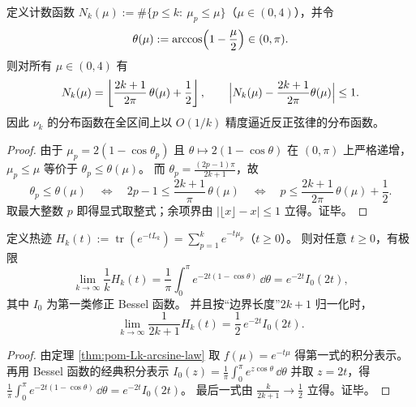 \begin{corollary}\label{cor:pom-Lk-discrete-weyl}
定义计数函数 \(N_k(\mu):=\#\{p\le k:\ \mu_p\le \mu\}\)（\(\mu\in(0,4)\)），并令
\[
\theta(\mu):=\arccos\Bigl(1-\frac{\mu}{2}\Bigr)\in(0,\pi).
\]
则对所有 \(\mu\in(0,4)\) 有
\[
N_k(\mu)=\left\lfloor \frac{2k+1}{2\pi}\,\theta(\mu)+\frac12\right\rfloor,
\qquad
\Bigl|N_k(\mu)-\frac{2k+1}{2\pi}\theta(\mu)\Bigr|\le 1.
\]
因此 \(\nu_k\) 的分布函数在全区间上以 \(O(1/k)\) 精度逼近反正弦律的分布函数。
\end{corollary}
\begin{proof}
由于 \(\mu_p=2(1-\cos\theta_p)\) 且 \(\theta\mapsto 2(1-\cos\theta)\) 在 \((0,\pi)\) 上严格递增，
\(\mu_p\le\mu\) 等价于 \(\theta_p\le \theta(\mu)\)。
而 \(\theta_p=\frac{(2p-1)\pi}{2k+1}\)，故
\[
\theta_p\le\theta(\mu)
\quad\Longleftrightarrow\quad
2p-1\le \frac{2k+1}{\pi}\,\theta(\mu)
\quad\Longleftrightarrow\quad
p\le \frac{2k+1}{2\pi}\,\theta(\mu)+\frac12.
\]
取最大整数 \(p\) 即得显式取整式；余项界由 \(|\lfloor x\rfloor-x|\le 1\) 立得。证毕。
\end{proof}

\begin{corollary}\label{cor:pom-Lk-heat-kernel-bessel}
定义热迹
\(
H_k(t):=\operatorname{tr}(e^{-tL_k})=\sum_{p=1}^{k}e^{-t\mu_p}
\)（\(t\ge 0\)）。
则对任意 \(t\ge 0\)，有极限
\[
\lim_{k\to\infty}\frac{1}{k}H_k(t)
=\frac{1}{\pi}\int_0^\pi e^{-2t(1-\cos\theta)}\,\dd\theta
=e^{-2t}I_0(2t),
\]
其中 \(I_0\) 为第一类修正 Bessel 函数。
并且按“边界长度”\(2k+1\) 归一化时，
\[
\lim_{k\to\infty}\frac{1}{2k+1}H_k(t)=\frac12\,e^{-2t}I_0(2t).
\]
\end{corollary}
\begin{proof}
由定理 \ref{thm:pom-Lk-arcsine-law} 取 \(f(\mu)=e^{-t\mu}\) 得第一式的积分表示。
再用 Bessel 函数的经典积分表示
\(
I_0(z)=\frac1\pi\int_0^\pi e^{z\cos\theta}\,\dd\theta
\)
并取 \(z=2t\)，得
\(
\frac{1}{\pi}\int_0^\pi e^{-2t(1-\cos\theta)}\,\dd\theta=e^{-2t}I_0(2t)
\)。
最后一式由 \(\frac{k}{2k+1}\to \frac12\) 立得。证毕。
\end{proof}

